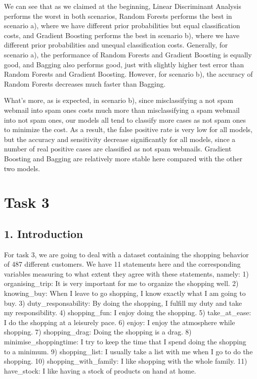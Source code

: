\documentclass[
  11pt,
]{article}
\begin{document}
We can see that as we claimed at the beginning, Linear Discriminant Analysis performs the worst in both scenarios, Random Forests performs the best in scenario a), where we have different prior probabilities but equal classification costs, and Gradient Boosting performs the best in scenario b), where we have different prior probabilities and unequal classification costs. Generally, for scenario a), the performance of Random Forests and Gradient Boosting is equally good, and Bagging also performs good, just with slightly higher test error than Random Forests and Gradient Boosting. However, for scenario b), the accuracy of Random Forests decreases much faster than Bagging.

What's more, as is expected, in scenario b), since misclassifying a not spam webmail into spam ones costs much more than misclassifying a spam webmail into not spam ones, our models all tend to classify more cases as not spam ones to minimize the cost. As a result, the false positive rate is very low for all models, but the accuracy and sensitivity decrease significantly for all models, since a number of real positive cases are classified as not spam webmails. Gradient Boosting and Bagging are relatively more stable here compared with the other two models.

\hypertarget{task-3}{%
\section{Task 3}\label{task-3}}

\hypertarget{introduction-2}{%
\subsection{1. Introduction}\label{introduction-2}}

For task 3, we are going to deal with a dataset containing the shopping behavior of 487 different customers. We have 11 statements here and the corresponding variables measuring to what extent they agree with these statements, namely:
1) organising\_trip: It is very important for me to organize the shopping well.
2) knowing\_buy: When I leave to go shopping, I know exactly what I am going to buy.
3) duty\_responsability: By doing the shopping, I fulfill my duty and take my responsibility.
4) shopping\_fun: I enjoy doing the shopping.
5) take\_at\_ease: I do the shopping at a leisurely pace.
6) enjoy: I enjoy the atmosphere while shopping.
7) shopping\_drag: Doing the shopping is a drag.
8) minimise\_shoppingtime: I try to keep the time that I spend doing the shopping to a minimum.
9) shopping\_list: I usually take a list with me when I go to do the shopping.
10) shopping\_with\_family: I like shopping with the whole family.
11) have\_stock: I like having a stock of products on hand at home.
\end{document}
